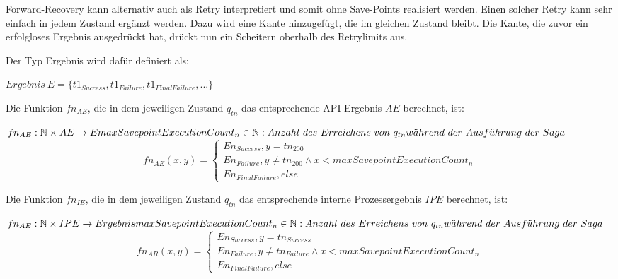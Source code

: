 Forward-Recovery kann alternativ auch als Retry interpretiert und somit ohne Save-Points realisiert werden. Einen solcher Retry kann sehr einfach in jedem Zustand ergänzt werden. Dazu wird eine Kante hinzugefügt, die im gleichen Zustand bleibt. Die Kante, die zuvor ein erfolgloses Ergebnis ausgedrückt hat, drückt nun ein Scheitern oberhalb des Retrylimits aus.

Der Typ Ergebnis wird dafür definiert als:
\begin{center}
	$Ergebnis\ E = \{t1_{Success}, t1_{Failure}, t1_{FinalFailure}, ...\}$
\end{center}

Die Funktion $fn_{AE}$, die in dem jeweiligen Zustand $q_{tn}$ das entsprechende API-Ergebnis $AE$ berechnet, ist:

\begin{math}
	fn_{AE}: \mathbb{N} \times AE \rightarrow E\\
	maxSavepointExecutionCount_n \in \mathbb{N}: Anzahl\ des\ Erreichens\ von\ q_{tn}\ \\ w\ddot{a}hrend\ der\ Ausf\ddot{u}hrung\ der\ Saga
\end{math}
\begin{equation*}
	fn_{AE}(x, y) = 
	\begin{cases}
		En_{Success}, y = tn_{200}\\
		En_{Failure}, y \neq tn_{200} \land x < maxSavepointExecutionCount_n\\
		En_{FinalFailure}, else
	\end{cases}
\end{equation*}

Die Funktion $fn_{IE}$, die in dem jeweiligen Zustand $q_{tn}$ das entsprechende interne Prozessergebnis $IPE$ berechnet, ist:

\begin{math}
	fn_{AE}: \mathbb{N} \times IPE \rightarrow Ergebnis\\
	maxSavepointExecutionCount_n \in \mathbb{N}: Anzahl\ des\ Erreichens\ von\ q_{tn}\ \\ w\ddot{a}hrend\ der\ Ausf\ddot{u}hrung\ der\ Saga
\end{math}
\begin{equation*}
	fn_{AR}(x, y) = 
	\begin{cases}
		En_{Success}, y = tn_{Success}\\
		En_{Failure}, y \neq tn_{Failure} \land x < maxSavepointExecutionCount_n\\
		En_{FinalFailure}, else
	\end{cases}
\end{equation*}

